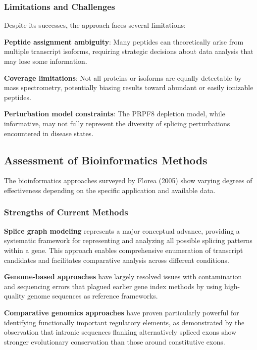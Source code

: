 \documentclass[12pt,a4paper]{article}
\begin{document}
\subsubsection{Limitations and Challenges}

Despite its successes, the approach faces several limitations:

\textbf{Peptide assignment ambiguity}: Many peptides can theoretically arise from multiple transcript isoforms, requiring strategic decisions about data analysis that may lose some information.

\textbf{Coverage limitations}: Not all proteins or isoforms are equally detectable by mass spectrometry, potentially biasing results toward abundant or easily ionizable peptides.

\textbf{Perturbation model constraints}: The PRPF8 depletion model, while informative, may not fully represent the diversity of splicing perturbations encountered in disease states.

\subsection{Assessment of Bioinformatics Methods}

The bioinformatics approaches surveyed by Florea (2005) show varying degrees of effectiveness depending on the specific application and available data.

\subsubsection{Strengths of Current Methods}

\textbf{Splice graph modeling} represents a major conceptual advance, providing a systematic framework for representing and analyzing all possible splicing patterns within a gene. This approach enables comprehensive enumeration of transcript candidates and facilitates comparative analysis across different conditions.

\textbf{Genome-based approaches} have largely resolved issues with contamination and sequencing errors that plagued earlier gene index methods by using high-quality genome sequences as reference frameworks.

\textbf{Comparative genomics approaches} have proven particularly powerful for identifying functionally important regulatory elements, as demonstrated by the observation that intronic sequences flanking alternatively spliced exons show stronger evolutionary conservation than those around constitutive exons.
\end{document}
